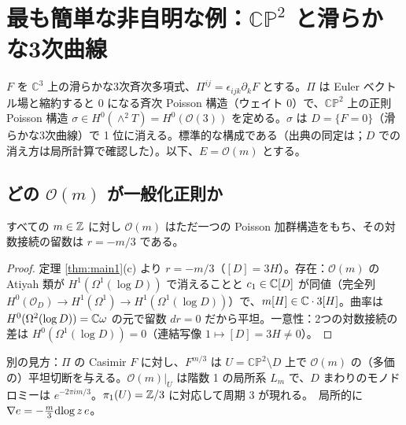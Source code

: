 \section{最も簡単な非自明な例：$\mathbb{CP}^2$ と滑らかな3次曲線}\label{sec:cp2}
$F$ を $\mathbb C^3$ 上の滑らかな3次斉次多項式、$\Pi^{ij}=\epsilon_{ijk}\partial_kF$ とする。$\Pi$ は Euler ベクトル場と縮約すると 0 になる斉次 Poisson 構造（ウェイト 0）で、$\mathbb{CP}^2$ 上の正則 Poisson 構造 $\sigma\in H^0(\wedge^2T)=H^0(\mathcal O(3))$ を定める。$\sigma$ は $D=\{F=0\}$（滑らかな3次曲線）で 1 位に消える。標準的な構成である（出典の同定は\tQ；$D$ での消え方は局所計算で確認した）。以下、$E=\mathcal O(m)$ とする。

\subsection{どの $\mathcal O(m)$ が一般化正則か}
\begin{prop}\tP\label{prop:cp2mod}
すべての $m\in\mathbb Z$ に対し $\mathcal O(m)$ はただ一つの Poisson 加群構造をもち、その対数接続の留数は $r=-m/3$ である。
\end{prop}
\begin{proof}
定理 \ref{thm:main1}(c) より $r=-m/3$（$[D]=3H$）。存在：$\mathcal O(m)$ の Atiyah 類が $H^1(\Omega^1(\log D))$ で消えることと $c_1\in\mathbb C[D]$ が同値（完全列 $H^0(\mathcal O_D)\to H^1(\Omega^1)\to H^1(\Omega^1(\log D))$）で、$m[H]\in\mathbb C\cdot3[H]$。曲率は $H^0(\Omega^2(\log D))=\mathbb C\omega$ の元で留数 $dr=0$ だから平坦。一意性：2つの対数接続の差は $H^0(\Omega^1(\log D))=0$（連結写像 $1\mapsto[D]=3H\ne0$）。\qedhere
\end{proof}
別の見方：$\Pi$ の Casimir $F$ に対し、$F^{m/3}$ は $U=\mathbb{CP}^2\setminus D$ 上で $\mathcal O(m)$ の（多価の）平坦切断を与える。$\mathcal O(m)|_U$ は階数 1 の局所系 $L_m$ で、$D$ まわりのモノドロミーは $e^{-2\pi im/3}$。$\pi_1(U)=\mathbb Z/3$ に対応して周期 3 が現れる。\tP\ 局所的に $\nabla e=-\tfrac m3\mathrm{dlog}\, z\,e$。

